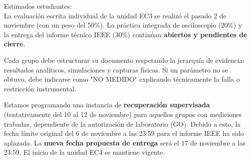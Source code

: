 \documentclass[11pt, a4paper]{article}
\begin{document}
\vspace{0.2cm}
\begin{tcolorbox}[colback=gray!5, colframe=black, title=\textbf{Mensaje de Actualización EC3 (Sujeto a Ratificación)}]
Estimados estudiantes: \\
La evaluación escrita individual de la unidad EC3 se realizó el pasado 2 de noviembre (con un peso del 50\%). La práctica integrada de osciloscopio (20\%) y la entrega del informe técnico IEEE (30\%) continúan \textbf{abiertos y pendientes de cierre}.

Cada grupo debe estructurar su documento respetando la jerarquía de evidencia: resultados analíticos, simulaciones y capturas físicas. Si un parámetro no se obtuvo, debe indicarse como "NO MEDIDO" explicando técnicamente la falla o restricción instrumental.

Estamos programando una instancia de \textbf{recuperación supervisada} (tentativamente del 10 al 12 de noviembre) para aquellos grupos con mediciones trabadas, dependiente de la autorización de laboratorio (GO). Debido a esto, la fecha límite original del 6 de noviembre a las 23:59 para el informe IEEE ha sido aplazada. La \textbf{nueva fecha propuesta de entrega} será el 17 de noviembre a las 23:59. El inicio de la unidad EC4 se mantiene vigente.
\end{tcolorbox}
\end{document}
